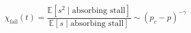 \begin{theorem}
\begin{equation}
  \chi_{\text{fail}}(t) = \frac{\mathbb{E}[s^2 \mid \text{absorbing stall}]}{\mathbb{E}[s \mid \text{absorbing stall}]} \sim (p_c - p)^{-\gamma}
\end{equation}
\end{theorem}
